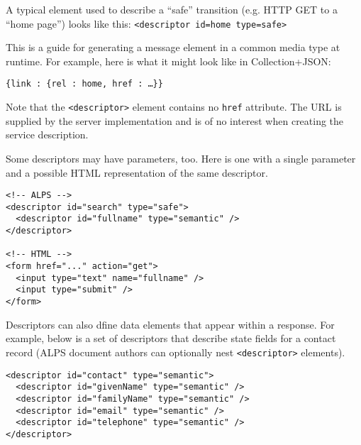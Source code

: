 \documentclass{wsrest2014}
\begin{document}
 \par{}A typical element used to describe a ``safe'' transition (e.g. HTTP GET to a ``home page'') looks like this:
\texttt{\textless{}descriptor id=\textquotedbl{}home\textquotedbl{} type=\textquotedbl{}safe\textquotedbl{}\textgreater{}}
 \par{}This is a guide for generating a message element in a common media type at runtime. For example, here is what it might look like in Collection+JSON:
 \par{}\texttt{\{{}\textquotedbl{}link\textquotedbl{} : \{{}\textquotedbl{}rel\textquotedbl{} : \textquotedbl{}home\textquotedbl{}, \textquotedbl{}href\textquotedbl{} : \textquotedbl{}\dots{}\textquotedbl{}\}{}\}{}}
 \par{}Note that the \texttt{\textless{}descriptor\textgreater{}} element contains no \texttt{href} attribute. The URL is supplied by the server implementation and is of no interest when creating the service description.
 \par{}Some descriptors may have parameters, too. Here is one with a single parameter and a possible HTML representation of the same descriptor.
\begin{verbatim}<!-- ALPS -->
<descriptor id="search" type="safe">
  <descriptor id="fullname" type="semantic" />
</descriptor>

<!-- HTML -->
<form href="..." action="get">
  <input type="text" name="fullname" />
  <input type="submit" />
</form>\end{verbatim}

 \par{}Descriptors can also dfine data elements that appear within a response. For example, below is a set of descriptors that describe state fields for a contact record (ALPS document authors can optionally nest \texttt{\textless{}descriptor\textgreater{}} elements).
\begin{verbatim}<descriptor id="contact" type="semantic">
  <descriptor id="givenName" type="semantic" />
  <descriptor id="familyName" type="semantic" />
  <descriptor id="email" type="semantic" />
  <descriptor id="telephone" type="semantic" />
</descriptor>\end{verbatim}

\hypertarget{_transitions_not_things_or_functionality}{}
\end{document}
